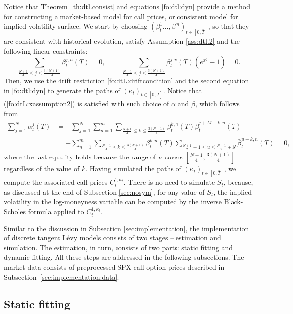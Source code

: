 \documentclass{article}
\numberwithin{equation}{section}
\def\bbeta{\bar{\beta}}
\begin{document}
Notice that Theorem~\ref{th:dtl.consist} and equations \eqref{fo:dtl:dyn} provide a method for constructing a market-based model for call prices, or consistent model for implied volatility surface. We start by choosing $(\beta^1_t\ldots,\beta^m)_{t\in[0,\bar{T}]}$, so that they are consistent with historical evolution, satisfy Assumption \ref{ass:dtl.2} and the following linear constraints:
\begin{equation*}
\sum_{ \frac{N+1}{4} \leq j \leq \frac{3(N+1)}{4}} \beta^{j,n}_t(T) = 0, 
\,\,\,\,\,\,\,\,\,\,\,\,\,\,\sum_{\frac{N+1}{4} \le j \le \frac{3(N+1)}{4}} \beta^{j,n}_t(T) (e^{x^j} - 1) = 0.
\end{equation*}
Then, we use the drift restriction \eqref{fo:dtL:driftcondition} and the second equation in \eqref{fo:dtl:dyn} to generate the paths of $(\kappa_t)_{t\in[0,\bar{T}]}$. Notice that (\ref{fo:dtL:xassumption2}) is satisfied with such  choice of $\alpha$ and $\beta$, which follows from
\begin{align*}
\sum_{j=1}^N \alpha^j_t(T) & = -\sum_{j=1}^N \sum_{n=1}^m \sum_{\frac{N+1}{4} \leq k \leq \frac{3(N+1)}{4}} \beta_t^{k,n}(T)\bbeta_t^{j+M-k,n}(T) \\
& = -\sum_{n=1}^m \sum_{\frac{N+1}{4} \leq k \leq \frac{3(N+1)}{4}}\beta_t^{k,n}(T) \sum_{\frac{N+1}{2}+1 \leq u \leq \frac{N+1}{2}+N}\bbeta_t^{u-k,n}(T) = 0,
\end{align*}
where the last equality holds because the range of $u$ covers $[\frac{N+1}{4}, \frac{3(N+1)}{4}]$ regardless of the value of $k$.
Having simulated the paths of $(\kappa_t)_{t\in[0,\bar{T}]}$, we compute the associated call prices $C_t^{1,\kappa_t}$. There is no need to simulate $S_t$, because, as discussed at the end of Subsection \ref{sec:nosym}, for any value of $S_t$, the implied volatility in the log-moneyness variable can be computed by the inverse Black-Scholes formula applied to $C_t^{1,\kappa_t}$.

Similar to the discussion in Subsection \ref{sec:implementation}, the implementation of discrete tangent L\'evy models consists of two stages -- estimation and simulation. The estimation, in turn, consists of two parts: static fitting and dynamic fitting. All these steps are addressed in the following subsections. The market data consists of preprocessed SPX call option prices described in Subsection~\ref{sec:implementation:data}.





\subsection{Static fitting}\label{subsec:dtL:static}
\end{document}
